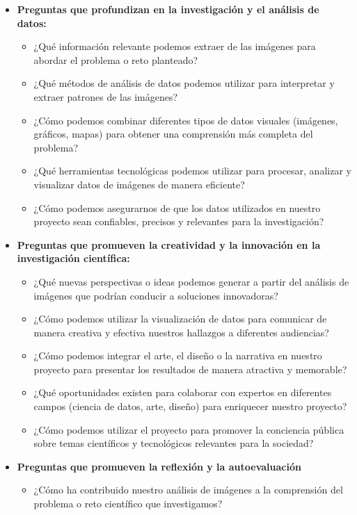 \begin{itemize}
    \item \textbf{Preguntas que profundizan en la investigación y el análisis de datos:}
    \begin{itemize}
        \item ¿Qué información relevante podemos extraer de las imágenes para abordar el problema o reto planteado?
        \item ¿Qué métodos de análisis de datos podemos utilizar para interpretar y extraer patrones de las imágenes?
        \item ¿Cómo podemos combinar diferentes tipos de datos visuales (imágenes, gráficos, mapas) para obtener una comprensión más completa del problema?
        \item ¿Qué herramientas tecnológicas podemos utilizar para procesar, analizar y visualizar datos de imágenes de manera eficiente?
        \item ¿Cómo podemos asegurarnos de que los datos utilizados en nuestro proyecto sean confiables, precisos y relevantes para la investigación?
    \end{itemize}
    \item \textbf{Preguntas que promueven la creatividad y la innovación en la investigación científica:}
    \begin{itemize}
        \item ¿Qué nuevas perspectivas o ideas podemos generar a partir del análisis de imágenes que podrían conducir a soluciones innovadoras?
        \item ¿Cómo podemos utilizar la visualización de datos para comunicar de manera creativa y efectiva nuestros hallazgos a diferentes audiencias?
        \item ¿Cómo podemos integrar el arte, el diseño o la narrativa en nuestro proyecto para presentar los resultados de manera atractiva y memorable?
        \item ¿Qué oportunidades existen para colaborar con expertos en diferentes campos (ciencia de datos, arte, diseño) para enriquecer nuestro proyecto?
        \item ¿Cómo podemos utilizar el proyecto para promover la conciencia pública sobre temas científicos y tecnológicos relevantes para la sociedad?
    \end{itemize}
    \item \textbf{Preguntas que promueven la reflexión y la autoevaluación}
    \begin{itemize}
        \item ¿Cómo ha contribuido nuestro análisis de imágenes a la comprensión del problema o reto científico que investigamos?

\end{itemize}
\end{itemize}
